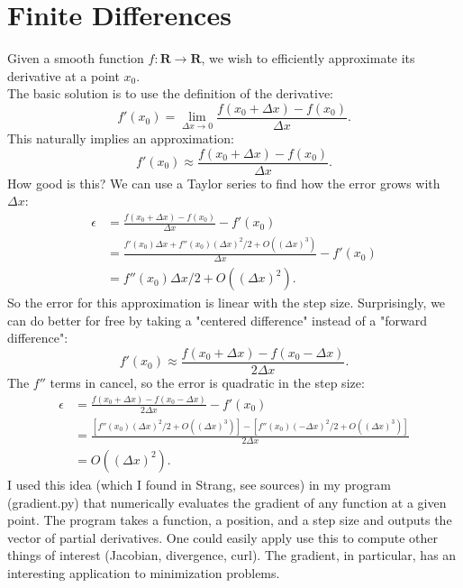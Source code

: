 \documentclass[11pt]{article}
\begin{document}
\section{Finite Differences}
\indent Given a smooth function $f:\mathbf{R}\to\mathbf{R}$, we wish to efficiently approximate its derivative at a point $x_0$. \\
The basic solution is to use the definition of the derivative:
\begin{equation*}
	f'(x_0) = \lim_{\Delta x\to 0}\frac{f(x_0+\Delta x) - f(x_0)}{\Delta x}.
\end{equation*}
This naturally implies an approximation:
\begin{equation*}
	f'(x_0) \approx \frac{f(x_0+\Delta x) - f(x_0)}{\Delta x}.
\end{equation*}
How good is this? We can use a Taylor series to find how the error grows with $\Delta x$:
\begin{align*}
	\epsilon &= \frac{f(x_0+\Delta x) - f(x_0)}{\Delta x} -f'(x_0)\\
	&= \frac{f'(x_0)\Delta x + f''(x_0)(\Delta x)^2/2 + O((\Delta x)^3)}{\Delta x} - f'(x_0) \\
	&= f''(x_0)\Delta x /2 + O((\Delta x)^2).
\end{align*}
So the error for this approximation is linear with the step size. Surprisingly, we can do better for free by taking a "centered difference" instead of a "forward difference":
\begin{equation*}
	f'(x_0) \approx \frac{f(x_0+\Delta x) - f(x_0-\Delta x)}{2\Delta x}.
\end{equation*}
The $f''$ terms in cancel, so the error is quadratic in the step size:
\begin{align*}
	\epsilon &= \frac{f(x_0+\Delta x) - f(x_0-\Delta x)}{2\Delta x} - f'(x_0) \\
	&= \frac{[f''(x_0)(\Delta x)^2/2 + O((\Delta x)^3)] - [f''(x_0)(-\Delta x)^2/2 + O((\Delta x)^3)]}{2\Delta x} \\
	&= O((\Delta x)^2).
\end{align*}
I used this idea (which I found in Strang, see sources) in my program (gradient.py) that numerically evaluates the gradient of any function at a given point. The program takes a function, a position, and a step size and outputs the vector of partial derivatives. One could easily apply use this to compute other things of interest (Jacobian, divergence, curl). The gradient, in particular, has an interesting application to minimization problems.
\end{document}

